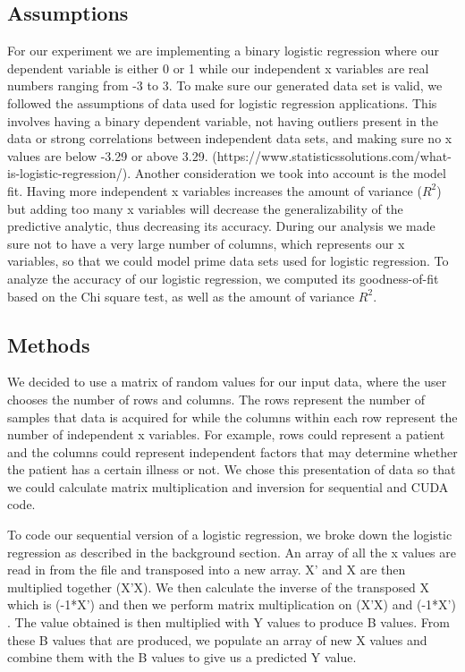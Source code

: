 \documentclass[letterpaper, 10 pt, conference]{ieeeconf}  %
\begin{document}
\subsection{Assumptions}
For our experiment we are implementing a binary logistic regression where our dependent variable is either 0 or 1 while our independent x variables are real numbers ranging from -3 to 3. To make sure our generated data set is valid, we followed the assumptions of data used for logistic regression applications. This involves having a binary dependent variable, not having outliers present in the data or strong correlations between independent data sets, and making sure no x values are below -3.29 or above 3.29. (https://www.statisticssolutions.com/what-is-logistic-regression/). Another consideration we took into account is the model fit. Having more independent x variables increases the amount of variance ($R^2$) but adding too many x variables will decrease the generalizability of the predictive analytic, thus decreasing its accuracy. During our analysis we made sure not to have a very large number of columns, which represents our x variables, so that we could model prime data sets used for logistic regression. To analyze the accuracy of our logistic regression, we computed its goodness-of-fit based on the Chi square test, as well as the amount of variance $R^2$. 

\subsection{Methods}
We decided to use a matrix of random values for our input data, where the user chooses the number of rows and columns. The rows represent the number of samples that data is acquired for while the columns within each row represent the number of independent x variables. For example, rows could represent a patient and the columns could represent independent factors that may determine whether the patient has a certain illness or not. We chose this presentation of data so that we could calculate matrix multiplication and inversion for sequential and CUDA code. 

To code our sequential version of a logistic regression, we broke down the logistic regression as described in the background section. An array of all the x values are read in from the file and transposed into a new array. X’ and X are then multiplied together (X’X). We then calculate the inverse of the transposed X which is (-1*X') and then we perform matrix multiplication on (X’X) and (-1*X’) . The value obtained is then multiplied with Y values to produce B values. From these B values that are produced, we populate an array of new X values and combine them with the B values to give us a predicted Y value. 
\end{document}
